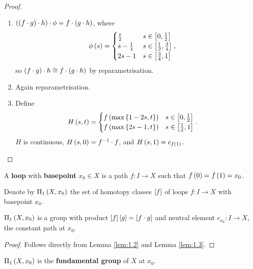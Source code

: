 \begin{proof}
\hfill
\begin{enumerate}
\item $ \rb{\rb{f \cdot g} \cdot h} \cdot \phi = f \cdot \rb{g \cdot h} $, where
$$ \phi\rb{s} =
\begin{cases}
\tfrac{s}{2} & s \in \sb{0, \tfrac{1}{2}} \\
s - \tfrac{1}{4} & s \in \sb{\tfrac{1}{2}, \tfrac{3}{4}} \\
2s - 1 & s \in \sb{\tfrac{3}{4}, 1}
\end{cases},
$$
so $ \rb{f \cdot g} \cdot h \cong f \cdot \rb{g \cdot h} $ by reparametrisation.
\item Again reparametrisation.
\item Define
$$ H\rb{s, t} =
\begin{cases}
f\rb{\max\cb{1 - 2s, t}} & s \in \sb{0, \tfrac{1}{2}} \\
f\rb{\max\cb{2s - 1, t}} & s \in \sb{\tfrac{1}{2}, 1}
\end{cases}.
$$
$ H $ is continuous, $ H\rb{s, 0} = f^{-1} \cdot f $, and $ H\rb{s, 1} = c_{f\rb{1}} $.
\end{enumerate}
\end{proof}

\begin{definition}
A \textbf{loop} with \textbf{basepoint} $ x_0 \in X $ is a path $ f : I \to X $ such that $ f\rb{0} = f\rb{1} = x_0 $.
\end{definition}

\begin{definition}
Denote by $ \Pi_1\rb{X, x_0} $ the set of homotopy classes $ \sb{f} $ of loops $ f : I \to X $ with basepoint $ x_0 $.
\end{definition}

\begin{proposition}
$ \Pi_1\rb{X, x_0} $ is a group with product $ \sb{f}\sb{g} = \sb{f \cdot g} $ and neutral element $ c_{x_0} : I \to X $, the constant path at $ x_0 $.
\end{proposition}

\begin{proof}
Follows directly from Lemma \ref{lem:1.2} and Lemma \ref{lem:1.3}.
\end{proof}

\begin{definition}
$ \Pi_1\rb{X, x_0} $ is the \textbf{fundamental group} of $ X $ at $ x_0 $.
\end{definition}

